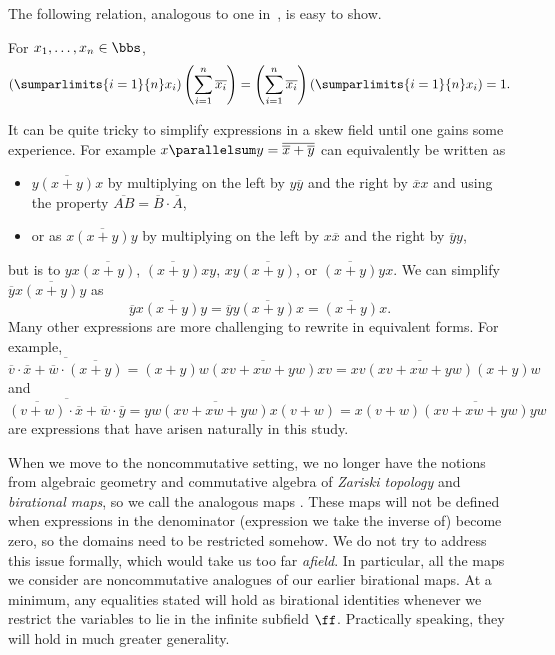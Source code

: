 The following  relation, analogous to one in~\cite[\S~5]{einpropp}, is easy to show.
\begin{prop}\label{prop:reciprocity}
For $x_1,\dots,x_n\in \bbs$,
\[
\left(\sumparlimits{i=1}{n} x_i\right)
\left(\sum\limits_{i=1}^n \overline{x_i}\right)=
\left(\sum\limits_{i=1}^n \overline{x_i}\right)
\left(\sumparlimits{i=1}{n} x_i\right) =1.
\]
\end{prop}


\begin{rema}
It can be quite tricky to simplify expressions in a skew field until one gains some
experience. 
For example $x\parallelsum y = \overline{\overline{x} + \overline{y}}$ can equivalently be written as
\begin{itemize}
 \item $y\overline{(x+y)}x$ by multiplying on the left by $y\overline{y}$ and the right by $\overline{x}x$
 and using the property $\overline{AB}=\overline{B}\cdot
 \overline{A}$,
 \item or as $x\overline{(x+y)}y$ by multiplying on the left by $x\overline{x}$ and the right by $\overline{y}y$,
\end{itemize}
but is  to
$yx\overline{(x+y)}$, $\overline{(x+y)}xy$, $xy\overline{(x+y)}$, or $\overline{(x+y)}yx$.
We can simplify $\overline{y}x\overline{(x+y)}y$ as
\[
\overline{y}x\overline{(x+y)}y=
\overline{y}y\overline{(x+y)}x
=\overline{(x+y)}x.
\]
Many other expressions are more challenging to rewrite in equivalent forms. For example,
\[
\overline{\overline{v}\cdot\overline{x}+
\overline{w}\cdot\overline{(x+y)}}=
(x+y)w\overline{(xv+xw+yw)}xv=
xv\overline{(xv+xw+yw)}(x+y)w
\]
and
\[
\overline{\overline{(v+w)}\cdot\overline{x}+\overline{w}
\cdot\overline{y}}=yw\overline{(xv+xw+yw)}x(v+w)=
x(v+w)\overline{(xv+xw+yw)}yw
\]
are expressions that have arisen naturally in this study. 
\end{rema}
\begin{rema}\label{rem:partialMap}
When we move to the noncommutative setting, we no longer have the notions from algebraic
geometry and commutative 
algebra of \textit{Zariski
topology} and \textit{birational maps}, so we call the analogous maps .
These maps will not be defined when 
expressions in the denominator (\ie expression we take the inverse of) become zero, so the domains need to be restricted somehow.
We do not try to address this issue formally, which would take us too far \emph{afield}. In
particular, all the maps we consider are noncommutative analogues of our earlier birational
maps. At a minimum, any equalities stated will hold as birational identities whenever we restrict the variables to lie
in the infinite subfield $\ff$. Practically speaking, they will hold in much greater generality.
\end{rema}

